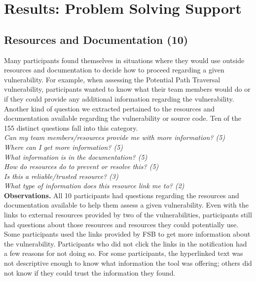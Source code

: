 \documentclass[conference]{IEEEtran}
\begin{document}



\section{Results: Problem Solving Support}
\label{sec:results-pss}



\noindent\subsection{\textbf{Resources and Documentation (10)}}\label{rd}

Many participants found themselves in situations where they would use outside resources and documentation to decide how to proceed regarding a given vulnerability.
For example, when assessing the Potential Path Traversal vulnerability, participants wanted to know what their team members would do or if they could provide any additional information regarding the vulnerability. 
Another kind of question we extracted pertained to the resources and documentation available regarding the vulnerability or source code. 
Ten of the 155 distinct questions fall into this category. 
\\

\noindent\emph{Can my team members/resources provide me with more information? (5)} \\
\emph{Where can I get more information? (5)} \\
\emph{What information is in the documentation? (5)} \\
\emph{How do resources do to prevent or resolve this? (5)} \\
\emph{Is this a reliable/trusted resource? (3)} \\
\emph{What type of information does this resource link me to? (2)} \\



\noindent\textbf{Observations.}
All 10 participants had questions regarding the resources and documentation available to help them assess a given vulnerability. 
Even with the links to external resources provided by two of the vulnerabilities, participants still had questions about those resources and resources they could potentially use. 
Some participants used the links provided by FSB to get more information about the vulnerability.
Participants who did not click the links in the notification had a few reasons for not doing so.
For some participants, the hyperlinked text was not descriptive enough to know what information the tool was offering; others did not know if they could trust the information they found.
\end{document}
